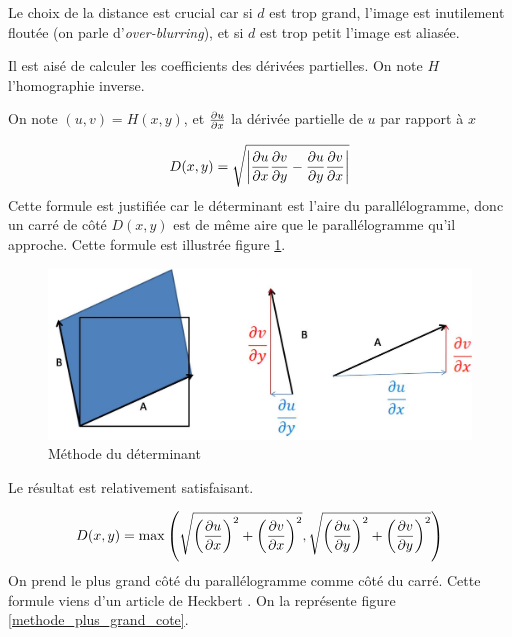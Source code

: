 Le choix de la distance est crucial car si $d$ est trop grand, l'image est inutilement floutée (on parle d'\emph{over-blurring}), et si $d$ est trop petit l'image est aliasée.

Il est aisé de calculer les coefficients des dérivées partielles. On note $H$ l'homographie inverse.



On note $(u,v)=H(x,y)$, et $\frac{\partial u}{\partial x}$ la dérivée partielle de $u$ par rapport à $x$

$$D(x,y) = \sqrt{ \left|\frac{\partial u}{\partial x}\frac{\partial v}{\partial y}-\frac{\partial u}{\partial y}\frac{\partial v}{\partial x}\right| }$$
Cette formule est justifiée car le déterminant est l'aire du parallélogramme, donc un carré de côté $D(x,y)$ est de même aire que le parallélogramme qu'il approche. Cette formule est illustrée figure \ref{methode_determinant}.

\begin{figure}[h!]
\centering
\includegraphics[scale=0.5]{methode_determinant.jpg}
\caption{Méthode du déterminant}
\label{methode_determinant}
\end{figure}


Le résultat est relativement satisfaisant.


$$ D(x,y) = \max \left(\sqrt{\left(\frac{\partial u}{\partial x}\right)^2 + \left(\frac{\partial v}{\partial x}\right)^2},\sqrt{\left(\frac{\partial u}{\partial y}\right)^2 + \left(\frac{\partial v}{\partial y}\right)^2}\right)$$
On prend le plus grand côté du parallélogramme comme côté du carré. Cette formule viens d'un article de Heckbert \cite{heckbert1983texture}. On la représente figure \ref{methode_plus_grand_cote}.

